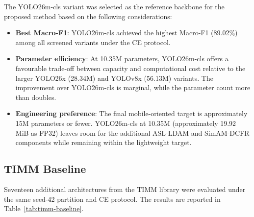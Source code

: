 The YOLO26m-cls variant was selected as the reference backbone for the proposed method based on the following considerations:

\begin{itemize}
    \item \textbf{Best Macro-F1}: YOLO26m-cls achieved the highest Macro-F1 (89.02\%) among all screened variants under the CE protocol.
    \item \textbf{Parameter efficiency}: At 10.35M parameters, YOLO26m-cls offers a favourable trade-off between capacity and computational cost relative to the larger YOLO26x (28.34M) and YOLOv8x (56.13M) variants. The improvement over YOLO26m-cls is marginal, while the parameter count more than doubles.
    \item \textbf{Engineering preference}: The final mobile-oriented target is approximately 15M parameters or fewer. YOLO26m-cls at 10.35M (approximately 19.92 MiB as FP32) leaves room for the additional ASL-LDAM and SimAM-DCFR components while remaining within the lightweight target.
\end{itemize}

\subsection{TIMM Baseline}
\label{sec:timm-baseline}

Seventeen additional architectures from the TIMM library were evaluated under the same seed-42 partition and CE protocol. The results are reported in Table~\ref{tab:timm-baseline}.

